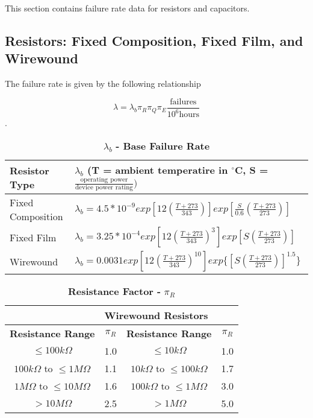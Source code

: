 This section contains failure rate data for resistors and capacitors.

\subsection{Resistors: Fixed Composition, Fixed Film, and Wirewound}
\label{section:resistors-fixed-composition-fixed-film-and-wirewound}

The failure rate is given by the following relationship

$$\lambda = \lambda_{b} \pi_{R} \pi_{Q} \pi_{E} \frac{\text{failures}}{10^{6} \text{hours}}$$.


\begin{table}[h]
\caption{$\lambda_{b} $ \textbf{- Base Failure Rate}}
\label{table:baseFailureRate}
\begin{tabular}{|l|m{10cm}|} \hline
\rowcolor{Gray}
\T \textbf{Resistor Type} &
$\lambda_b$ 
(T = ambient temperatire in $^\circ$C, 
S = $\frac{\text{operating power}}{\text{device power rating}})$ \B \\ \hline
\T Fixed Composition & 
$\lambda_b = 4.5*10^{-9} exp [12(\frac{T+273}{343})] exp[\frac{S}{0.6}(\frac{T+273}{273})]$ \B \\ \hline
\T Fixed Film &
$\lambda_b = 3.25*10^{-4} exp [12(\frac{T+273}{343})^3] exp[S(\frac{T+273}{273})]$ \B \\ \hline
\T Wirewound &
$\lambda_b = 0.0031 exp [12(\frac{T+273}{343})^{10}] exp\{[S(\frac{T+273}{273})]^{1.5}\}$ \B \\ \hline
\end{tabular}
\end{table}




\begin{table}[h]
\caption{\textbf{Resistance Factor -} $\pi_{R}$}
\label{table:resistanceFactor}
\begin{tabular}{|c|c|c|c|} \hline
\rowcolor{Gray}
\multicolumn{2}{|l|}{\textbf{Fixed Composition or Fixed Film Resistors}} &  \multicolumn{2}{|l|}{\textbf{Wirewound Resistors}} \\ \hline
\rowcolor{Gray}
\textbf{Resistance Range} & $\pi_{R}$ & \textbf{Resistance Range} & $\pi_{R}$ \\ \hline
$ \leq 100k\Omega$                            & 1.0 & $ \leq 10k\Omega$                                     & 1.0 \\ \hline
$ 100k\Omega$ to $\leq 1M\Omega$ & 1.1 & $ 10k\Omega$ to $\leq 100k\Omega$  & 1.7 \\ \hline
$ 1M\Omega$ to $\leq 10M\Omega$  & 1.6 & $ 100k\Omega$ to $\leq 1M\Omega$  & 3.0 \\ \hline
$ > 10M\Omega$                                 & 2.5 & $ > 1M\Omega$                                     & 5.0 \\ \hline
\end{tabular}
\end{table}



